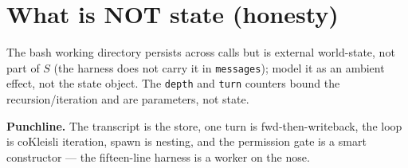 \documentclass[11pt]{article}
\theoremstyle{plain}
\theoremstyle{definition}
\theoremstyle{remark}
\begin{document}
\section{What is NOT state (honesty)}

The bash working directory persists across calls but is external world-state, not part of $S$
(the harness does not carry it in \texttt{messages}); model it as an ambient effect, not the
state object. The \texttt{depth} and \texttt{turn} counters bound the recursion/iteration and
are parameters, not state.

\bigskip

\noindent\textbf{Punchline.} The transcript is the store, one turn is fwd-then-writeback, the
loop is coKleisli iteration, spawn is nesting, and the permission gate is a smart constructor
--- the fifteen-line harness is a worker on the nose.
\end{document}
